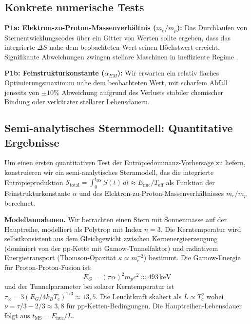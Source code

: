 \documentclass[12pt,a4paper]{article}
\theoremstyle{remark}
\begin{document}
\subsection{Konkrete numerische Tests}

\textbf{P1a: Elektron-zu-Proton-Massenverh\"altnis ($m_e/m_p$):} Das Durchlaufen von Sternentwicklungscodes \"uber ein Gitter von Werten sollte ergeben, dass das integrierte $\Delta S$ nahe dem beobachteten Wert seinen H\"ochstwert erreicht. Signifikante Abweichungen zwingen stellare Maschinen in ineffiziente Regime \citep{Adams2019}.

\textbf{P1b: Feinstrukturkonstante ($\alpha_{EM}$):} Wir erwarten ein relativ flaches Optimierungsmaximum nahe dem beobachteten Wert, mit scharfem Abfall jenseits von $\pm 10\%$ Abweichung aufgrund des Verlusts stabiler chemischer Bindung oder verk\"urzter stellarer Lebensdauern.

\subsection{Semi-analytisches Sternmodell: Quantitative Ergebnisse}
\label{sec:stellar_model}

Um einen ersten quantitativen Test der Entropiedominanz-Vorhersage zu liefern, konstruieren wir ein semi-analytisches Sternmodell, das die integrierte Entropieproduktion $\mathcal{S}_{\text{total}} = \int_0^{t_{\text{MS}}} \dot{S}(t)\,dt \approx E_{\text{nuc}} / T_{\text{eff}}$ als Funktion der Feinstrukturkonstante $\alpha$ und des Elektron-zu-Proton-Massenverh\"altnisses $m_e/m_p$ berechnet.

\textbf{Modellannahmen.} Wir betrachten einen Stern mit Sonnenmasse auf der Hauptreihe, modelliert als Polytrop mit Index $n = 3$. Die Kerntemperatur wird selbstkonsistent aus dem Gleichgewicht zwischen Kernenergieerzeugung (dominiert von der pp-Kette mit Gamow-Tunnelfaktor) und radiativem Energietransport (Thomson-Opazit\"at $\kappa \propto m_e^{-2}$) bestimmt. Die Gamow-Energie f\"ur Proton-Proton-Fusion ist:
\begin{equation}
E_G = (\pi \alpha)^2 m_p c^2 \approx 493\,\text{keV}
\end{equation}
und der Tunnelparameter bei solarer Kerntemperatur ist $\tau_\odot = 3(E_G / 4 k_B T_c)^{1/3} \approx 13{,}5$. Die Leuchtkraft skaliert als $L \propto T_c^{\nu}$ wobei $\nu = \tau/3 - 2/3 \approx 3{,}8$ f\"ur pp-Ketten-Bedingungen. Die Hauptreihen-Lebensdauer folgt aus $t_{\text{MS}} = E_{\text{nuc}} / L$.
\end{document}
